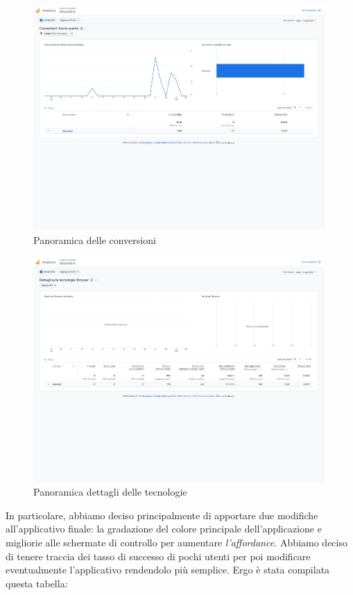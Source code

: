 \begin{figure}[H]
    \centering
    \includegraphics[width=0.99\textwidth]{Immagini/Alexandria/Report/conversioni-1.png}
    \caption{Panoramica delle conversioni}
\end{figure}

\begin{figure}[H]
    \centering
    \includegraphics[width=0.99\textwidth]{Immagini/Alexandria/Report/dettagliTecnologia-1.png}
    \caption{Panoramica dettagli delle tecnologie}
\end{figure}

In particolare, abbiamo deciso principalmente di apportare due modifiche all'applicativo finale: la gradazione del colore principale dell'applicazione e migliorie alle schermate di controllo per aumentare \textit{l'affordance.} Abbiamo deciso di tenere traccia dei tasso di successo di pochi utenti per poi modificare eventualmente l'applicativo rendendolo più semplice. Ergo è stata compilata questa tabella:

